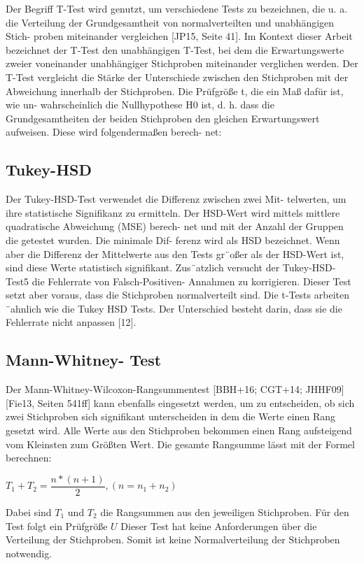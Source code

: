 Der Begriff T-Test wird genutzt, um verschiedene Tests zu bezeichnen, die
u. a. die Verteilung der Grundgesamtheit von normalverteilten und unabhängigen Stich-
proben miteinander vergleichen [JP15, Seite 41]. Im Kontext dieser Arbeit bezeichnet
der T-Test den unabhängigen T-Test, bei dem die Erwartungswerte zweier voneinander
unabhängiger Stichproben miteinander verglichen werden.
Der T-Test vergleicht die Stärke der Unterschiede zwischen den Stichproben mit der
Abweichung innerhalb der Stichproben. Die Prüfgröße t, die ein Maß dafür ist, wie un-
wahrscheinlich die Nullhypothese H0 ist, d. h. dass die Grundgesamtheiten der beiden
Stichproben den gleichen Erwartungswert aufweisen. Diese wird folgendermaßen berech-
net:
\subsection{Tukey-HSD}
Der Tukey-HSD-Test verwendet die Differenz zwischen zwei Mit-
telwerten, um ihre statistische Signifikanz zu ermitteln.
Der HSD-Wert wird mittels mittlere quadratische Abweichung (MSE) berech-
net und mit der Anzahl der Gruppen die getestet wurden. Die minimale Dif-
ferenz wird als HSD bezeichnet. Wenn aber die Differenz der Mittelwerte aus
den Tests gr¨oßer als der HSD-Wert ist, sind diese Werte statistisch signifikant.
Zus¨atzlich versucht der Tukey-HSD-Test5 die Fehlerrate von Falsch-Positiven-
Annahmen zu korrigieren. Dieser Test setzt aber voraus, dass die Stichproben
normalverteilt sind. Die t-Tests arbeiten ¨ahnlich wie die Tukey HSD Tests. Der
Unterschied besteht darin, dass sie die Fehlerrate nicht anpassen [12]. 

\subsection{Mann-Whitney-
Test}
Der Mann-Whitney-Wilcoxon-Rangsummentest [BBH+16; CGT+14; JHHF09]
[Fie13, Seiten 541ff] kann ebenfalls eingesetzt werden, um zu entscheiden, ob sich zwei
Stichproben sich signifikant unterscheiden in dem die Werte einen Rang gesetzt wird. 
Alle Werte aus den Stichproben bekommen einen Rang aufsteigend vom Kleinsten zum Größten Wert.
Die gesamte Rangsumme lässt mit der Formel berechnen:
\begin{center}
  $T_1 + T_2 = \dfrac{n * (n + 1)}{2}, (n = n_1 + n_2)$
\end{center}  

Dabei sind $T_1$ und $T_2$ die Rangsummen aus den jeweiligen Stichproben.
Für den Test folgt ein Prüfgröße $U$  
Dieser Test
hat keine Anforderungen über die Verteilung der Stichproben.
Somit ist keine Normalverteilung der Stichproben notwendig.


